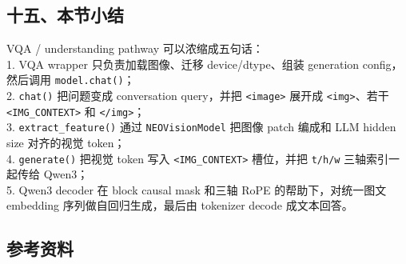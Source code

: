 \subsection{十五、本节小结}

\begin{summarybox}
VQA / understanding pathway 可以浓缩成五句话：\\
1. VQA wrapper 只负责加载图像、迁移 device/dtype、组装 generation config，然后调用 \texttt{model.chat()}；\\
2. \texttt{chat()} 把问题变成 conversation query，并把 \texttt{<image>} 展开成 \texttt{<img>}、若干 \texttt{<IMG\_CONTEXT>} 和 \texttt{</img>}；\\
3. \texttt{extract\_feature()} 通过 \texttt{NEOVisionModel} 把图像 patch 编成和 LLM hidden size 对齐的视觉 token；\\
4. \texttt{generate()} 把视觉 token 写入 \texttt{<IMG\_CONTEXT>} 槽位，并把 \texttt{t/h/w} 三轴索引一起传给 Qwen3；\\
5. Qwen3 decoder 在 block causal mask 和三轴 RoPE 的帮助下，对统一图文 embedding 序列做自回归生成，最后由 tokenizer decode 成文本回答。
\end{summarybox}

\subsection{参考资料}

